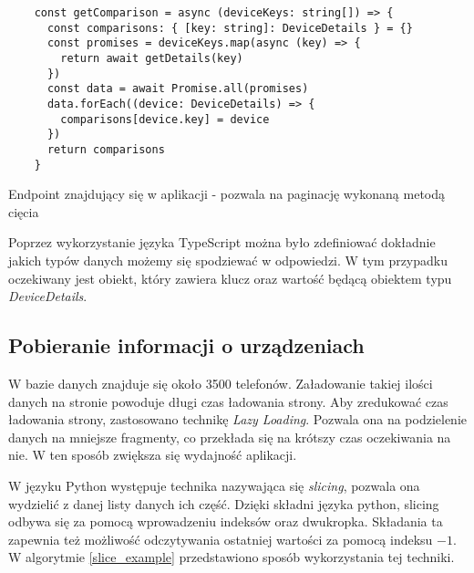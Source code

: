 \begin{code}[H]
  \begin{verbatim}
    const getComparison = async (deviceKeys: string[]) => {
      const comparisons: { [key: string]: DeviceDetails } = {}
      const promises = deviceKeys.map(async (key) => {
        return await getDetails(key)
      })
      const data = await Promise.all(promises)
      data.forEach((device: DeviceDetails) => {
        comparisons[device.key] = device
      })
      return comparisons
    }
  \end{verbatim}
  \caption{Endpoint znajdujący się w aplikacji - pozwala na paginację wykonaną metodą cięcia}
  \label{getting_devices}
\end{code}
Poprzez wykorzystanie języka TypeScript można było zdefiniować dokładnie jakich typów danych możemy się spodziewać w odpowiedzi. W tym przypadku oczekiwany jest obiekt, który zawiera klucz oraz wartość będącą obiektem typu \textit{DeviceDetails}. 


\subsection{Pobieranie informacji o urządzeniach}
W bazie danych znajduje się około 3500 telefonów. Załadowanie takiej ilości danych na stronie powoduje długi czas ładowania strony. Aby zredukować czas ładowania strony, zastosowano technikę \textit{Lazy Loading}. Pozwala ona na podzielenie danych na mniejsze fragmenty, co przekłada się na krótszy czas oczekiwania na nie. W ten sposób zwiększa się wydajność aplikacji.

W języku Python występuje technika nazywająca się \textit{slicing}, pozwala ona wydzielić z danej listy danych ich część. Dzięki składni języka python, slicing odbywa się za pomocą wprowadzeniu indeksów oraz dwukropka. Składania ta zapewnia też możliwość odczytywania ostatniej wartości za pomocą indeksu $-1$. W algorytmie \ref{slice_example} przedstawiono sposób wykorzystania tej techniki.

